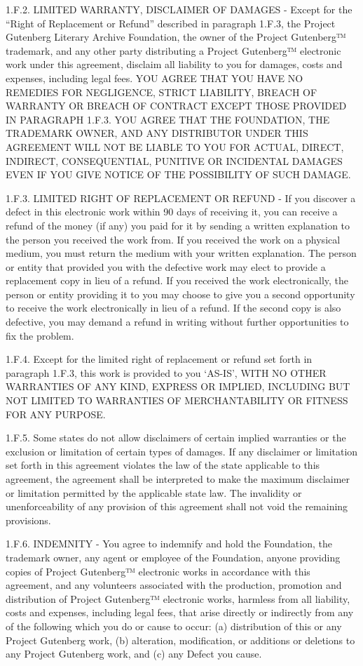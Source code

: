 \documentclass[11pt,openany,oneside]{book}
\begin{document}
1.F.2. LIMITED WARRANTY, DISCLAIMER OF DAMAGES - Except for the “Right of Replacement or Refund” described in paragraph 1.F.3, the Project Gutenberg Literary Archive Foundation, the owner of the Project Gutenberg™ trademark, and any other party distributing a Project Gutenberg™ electronic work under this agreement, disclaim all liability to you for damages, costs and expenses, including legal fees. YOU AGREE THAT YOU HAVE NO REMEDIES FOR NEGLIGENCE, STRICT LIABILITY, BREACH OF WARRANTY OR BREACH OF CONTRACT EXCEPT THOSE PROVIDED IN PARAGRAPH 1.F.3. YOU AGREE THAT THE FOUNDATION, THE TRADEMARK OWNER, AND ANY DISTRIBUTOR UNDER THIS AGREEMENT WILL NOT BE LIABLE TO YOU FOR ACTUAL, DIRECT, INDIRECT, CONSEQUENTIAL, PUNITIVE OR INCIDENTAL DAMAGES EVEN IF YOU GIVE NOTICE OF THE POSSIBILITY OF SUCH DAMAGE. 

1.F.3. LIMITED RIGHT OF REPLACEMENT OR REFUND - If you discover a defect in this electronic work within 90 days of receiving it, you can receive a refund of the money (if any) you paid for it by sending a written explanation to the person you received the work from. If you received the work on a physical medium, you must return the medium with your written explanation. The person or entity that provided you with the defective work may elect to provide a replacement copy in lieu of a refund. If you received the work electronically, the person or entity providing it to you may choose to give you a second opportunity to receive the work electronically in lieu of a refund. If the second copy is also defective, you may demand a refund in writing without further opportunities to fix the problem. 

1.F.4. Except for the limited right of replacement or refund set forth in paragraph 1.F.3, this work is provided to you ‘AS-IS’, WITH NO OTHER WARRANTIES OF ANY KIND, EXPRESS OR IMPLIED, INCLUDING BUT NOT LIMITED TO WARRANTIES OF MERCHANTABILITY OR FITNESS FOR ANY PURPOSE. 

1.F.5. Some states do not allow disclaimers of certain implied warranties or the exclusion or limitation of certain types of damages. If any disclaimer or limitation set forth in this agreement violates the law of the state applicable to this agreement, the agreement shall be interpreted to make the maximum disclaimer or limitation permitted by the applicable state law. The invalidity or unenforceability of any provision of this agreement shall not void the remaining provisions. 

1.F.6. INDEMNITY - You agree to indemnify and hold the Foundation, the trademark owner, any agent or employee of the Foundation, anyone providing copies of Project Gutenberg™ electronic works in accordance with this agreement, and any volunteers associated with the production, promotion and distribution of Project Gutenberg™ electronic works, harmless from all liability, costs and expenses, including legal fees, that arise directly or indirectly from any of the following which you do or cause to occur: (a) distribution of this or any Project Gutenberg work, (b) alteration, modification, or additions or deletions to any Project Gutenberg work, and (c) any Defect you cause. 
\end{document}
